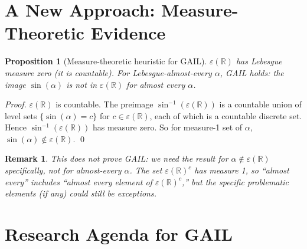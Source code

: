 \documentclass[11pt]{article}
\newtheorem{proposition}[theorem]{Proposition}
\newtheorem{remark}[theorem]{Remark}
\begin{document}
\section{A New Approach: Measure-Theoretic Evidence}

\begin{proposition}[Measure-theoretic heuristic for GAIL]
$\varepsilon(\mathbb{R})$ has Lebesgue measure zero (it is countable).
For Lebesgue-almost-every $\alpha$, GAIL holds: the image $\sin(\alpha)$
is not in $\varepsilon(\mathbb{R})$ for almost every $\alpha$.
\end{proposition}

\begin{proof}
$\varepsilon(\mathbb{R})$ is countable. The preimage $\sin^{-1}(\varepsilon(\mathbb{R}))$
is a countable union of level sets $\{\sin(\alpha) = c\}$ for $c \in \varepsilon(\mathbb{R})$,
each of which is a countable discrete set. Hence $\sin^{-1}(\varepsilon(\mathbb{R}))$
has measure zero. So for measure-1 set of $\alpha$, $\sin(\alpha) \notin \varepsilon(\mathbb{R})$. \qed
\end{proof}

\begin{remark}
This does not prove GAIL: we need the result for $\alpha \notin \varepsilon(\mathbb{R})$
specifically, not for almost-every $\alpha$. The set $\varepsilon(\mathbb{R})^c$
has measure 1, so ``almost every'' includes ``almost every element of $\varepsilon(\mathbb{R})^c$,''
but the specific problematic elements (if any) could still be exceptions.
\end{remark}

\section{Research Agenda for GAIL}
\end{document}
